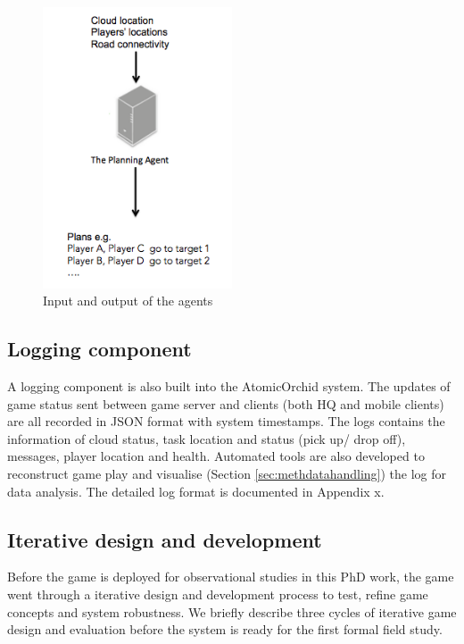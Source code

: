 \begin{figure}[h]
  \centering
  \includegraphics[width=0.5\textwidth]{img/approach/inputoutput}
  \caption{Input and output of the agents}
  \label{fig:inputoutput}
\end{figure}

\subsection{Logging component} \label{sec:applogging}
A logging component is also built into the AtomicOrchid system. The updates of game status sent between game server and clients (both HQ and mobile clients) are all recorded in JSON format with system timestamps. The logs contains the information of cloud status, task location and status (pick up/ drop off), messages, player location and health. Automated tools are also developed to reconstruct game play and visualise (Section \ref{sec:methdatahandling}) the log for data analysis. The detailed log format is documented in Appendix x.

\subsection{Iterative design and development}
Before the game is deployed for observational studies in this PhD work, the game went through a iterative design and development process to test, refine game concepts and system robustness. We briefly describe three cycles of iterative game design and evaluation before the system is ready for the first formal field study.\\


